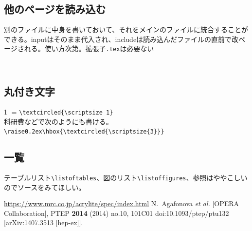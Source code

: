 \documentclass[a4j]{jsarticle}
\begin{document}
\subsection{他のページを読み込む}
別のファイルに中身を書いておいて、それをメインのファイルに統合することができる。inputはそのまま代入され、includeは読み込んだファイルの直前で改ページされる。使い方次第。拡張子\verb|.tex|は必要ない
\begin{verbatim}


\end{verbatim}

\subsection{丸付き文字}
\textcircled{\scriptsize 1} = \verb|\textcircled{\scriptsize 1}|\\
科研費などで次のようにも書ける。\verb|\raise0.2ex\hbox{\textcircled{\scriptsize{3}}}|

\subsection{一覧}
テーブルリスト\verb|\listoftables|、図のリスト\verb|\listoffigures|、参照はややこしいのでソースをみてほしい。
\listoftables %
\listoffigures %

\begin{thebibliography}{99}
\url{https://www.mrc.co.jp/acrylite/spec/index.html}
  N.~Agafonova {\it et al.} [OPERA Collaboration],
  PTEP {\bf 2014} (2014) no.10,  101C01
  doi:10.1093/ptep/ptu132
  [arXiv:1407.3513 [hep-ex]].
\end{thebibliography}
\end{document}
